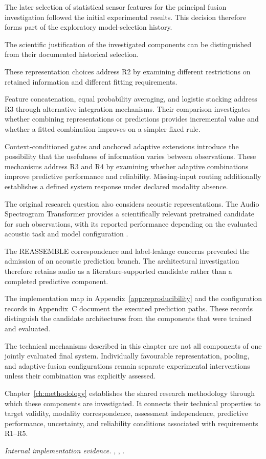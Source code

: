 The later selection of statistical sensor features for the principal fusion investigation followed the initial experimental results. This decision therefore forms part of the exploratory model-selection history.

The scientific justification of the investigated components can be distinguished from their documented historical selection.

These representation choices address R2 by examining different restrictions on retained information and different fitting requirements.

Feature concatenation, equal probability averaging, and logistic stacking address R3 through alternative integration mechanisms. Their comparison investigates whether combining representations or predictions provides incremental value and whether a fitted combination improves on a simpler fixed rule.

Context-conditioned gates and anchored adaptive extensions introduce the possibility that the usefulness of information varies between observations. These mechanisms address R3 and R4 by examining whether adaptive combinations improve predictive performance and reliability. Missing-input routing additionally establishes a defined system response under declared modality absence.

The original research question also considers acoustic representations. The Audio Spectrogram Transformer provides a scientifically relevant pretrained candidate for such observations, with its reported performance depending on the evaluated acoustic task and model configuration \parencite{P011}.

The REASSEMBLE correspondence and label-leakage concerns prevented the admission of an acoustic prediction branch. The architectural investigation therefore retains audio as a literature-supported candidate rather than a completed predictive component.

The implementation map in Appendix~\ref{app:reproducibility} and the configuration records in Appendix~C document the executed prediction paths. These records distinguish the candidate architectures from the components that were trained and evaluated.

The technical mechanisms described in this chapter are not all components of one jointly evaluated final system. Individually favourable representation, pooling, and adaptive-fusion configurations remain separate experimental interventions unless their combination was explicitly assessed.

Chapter~\ref{ch:methodology} establishes the shared research methodology through which these components are investigated. It connects their technical properties to target validity, modality correspondence, assessment independence, predictive performance, uncertainty, and reliability conditions associated with requirements R1–R5.

\noindent\textit{Internal implementation evidence.} , , .
